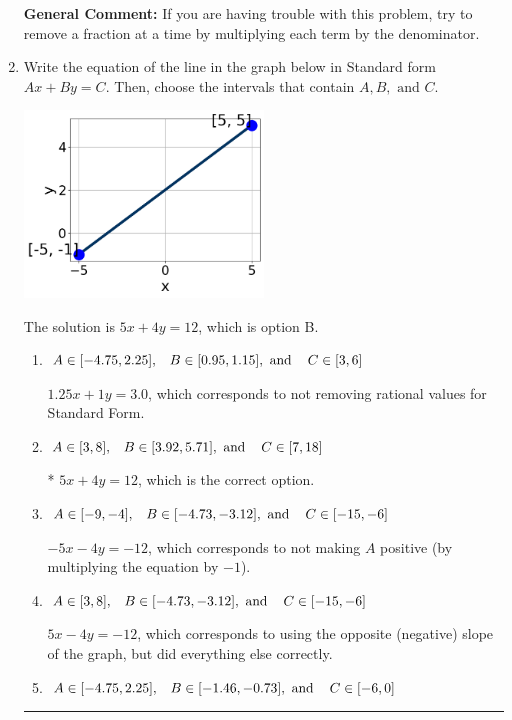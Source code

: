 \documentclass{extbook}[14pt]
\newcommand{\litem}[1]{\item #1

\rule{\textwidth}{0.4pt}}
\begin{document}
\begin{enumerate}
{\textbf{General Comment:} If you are having trouble with this problem, try to remove a fraction at a time by multiplying each term by the denominator.
}
\litem{
Write the equation of the line in the graph below in Standard form $Ax+By=C$. Then, choose the intervals that contain $A, B, \text{ and } C$.

\begin{center}
    \includegraphics[width=0.5\textwidth]{../Figures/linearGraphToStandardCopyB.png}
\end{center}


The solution is \( 5x + 4y = 12 \), which is option B.\begin{enumerate}[label=\Alph*.]
\item \( A \in [-4.75, 2.25], \hspace{3mm} B \in [0.95, 1.15], \text{ and } \hspace{3mm} C \in [3, 6] \)

 $1.25x + 1y = 3.0$, which corresponds to not removing rational values for Standard Form.
\item \( A \in [3, 8], \hspace{3mm} B \in [3.92, 5.71], \text{ and } \hspace{3mm} C \in [7, 18] \)

* $5x + 4y = 12$, which is the correct option.
\item \( A \in [-9, -4], \hspace{3mm} B \in [-4.73, -3.12], \text{ and } \hspace{3mm} C \in [-15, -6] \)

 $-5x - 4y = -12$, which corresponds to not making $A$ positive (by multiplying the equation by $-1$).
\item \( A \in [3, 8], \hspace{3mm} B \in [-4.73, -3.12], \text{ and } \hspace{3mm} C \in [-15, -6] \)

 $5x - 4y = -12$, which corresponds to using the opposite (negative) slope of the graph, but did everything else correctly.
\item \( A \in [-4.75, 2.25], \hspace{3mm} B \in [-1.46, -0.73], \text{ and } \hspace{3mm} C \in [-6, 0] \)


\end{enumerate}}
\end{enumerate}
\end{document}
